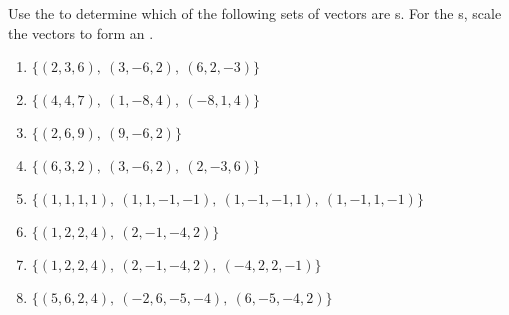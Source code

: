 \begin{exercise} \label{ex:} 
Use the  to determine which of the following sets of vectors are s.
For the s, scale the vectors to form an .

\begin{enumerate}
\item \(\{(2,3,6),\ (3,-6,2),\ (6,2,-3)\}\)

\item \(\{(4,4,7),\ (1,-8,4),\ (-8,1,4)\}\)

\item \(\{(2,6,9),\ (9,-6,2)\}\)

\item \(\{(6,3,2),\ (3,-6,2),\ (2,-3,6)\}\)

\item \(\{(1,1,1,1),\ (1,1,-1,-1),\ (1,-1,-1,1),\ (1,-1,1,-1)\}\)

\item \(\{(1,2,2,4),\ (2,-1,-4,2)\}\)

\item \(\{(1,2,2,4),\ (2,-1,-4,2),\ (-4,2,2,-1)\}\)

\item \(\{(5,6,2,4),\ (-2,6,-5,-4),\ (6,-5,-4,2)\}\)

\end{enumerate}
\end{exercise}


